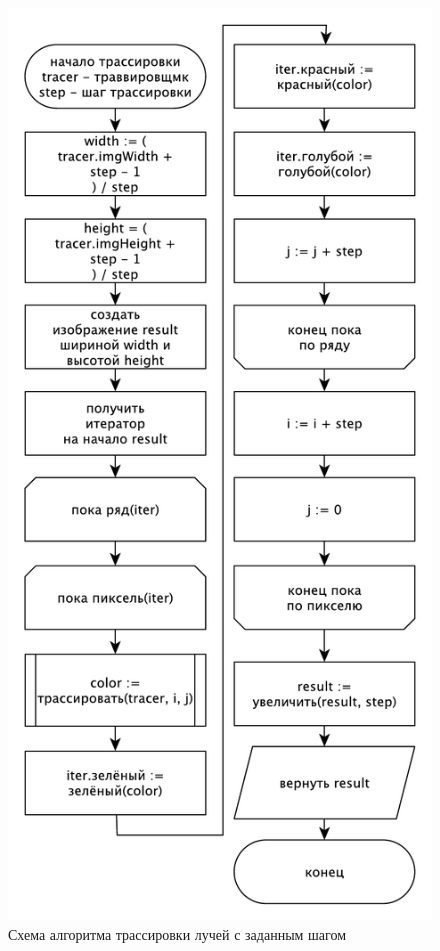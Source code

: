 {    \begin{figure}[H]
    	\centering
    	\includegraphics[height=0.4\textheight]{img/trace1.pdf}
    	\caption{Схема алгоритма трассировки лучей с заданным шагом}
    	\label{fig:trace1}
    \end{figure}

}
